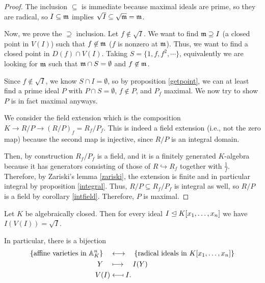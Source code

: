 \documentclass[12pt]{article}
\begin{document}
\begin{proof}
    The inclusion $\subseteq$ is immediate because maximal ideals are prime, so they are radical, so $I\subseteq \mathfrak{m}$ implies $\sqrt{I}\subseteq \sqrt{\mathfrak{m}} =\mathfrak{m}$.
    
    Now, we prove the $\supseteq$ inclusion. Let $f\not\in \sqrt{I}$. We want to find $\mathfrak{m} \supseteq I$ (a closed point in $V(I)$) such that $f\not\in \mathfrak{m}$ ($f$ is nonzero at $\mathfrak{m}$). Thus, we want to find a closed point in $D(f)\cap V(I)$. Taking $S=\{1,f,f^2,\cdots\}$, equivalently we are looking for $\mathfrak{m}$ such that $\mathfrak{m}\cap S =\emptyset$ and $f\not\in \mathfrak{m}$.
    
    Since $f\not\in \sqrt{I}$, we know $S\cap I =\emptyset$, so by proposition \ref{getpoint}, we can at least find a prime ideal $P$ with $P\cap S=\emptyset$, $f\not\in P$, and $P_f$ maximal. We now try to show $P$ is in fact maximal anyways.
    
    We consider the field extension which is the composition $K\to R/P \to (R/P)_f = R_f/P_f$. This is indeed a field extension (i.e., not the zero map) because the second map is injective, since $R/P$ is an integral domain.
    
    Then, by construction $R_f/P_f$ is a field, and it is a finitely generated $K$-algebra because it has generators consisting of those of $R\hookrightarrow R_f$ together with $\frac{1}{f}$. Therefore, by Zariski's lemma \ref{zariski}, the extension is finite and in particular integral by proposition \ref{integral}. Thus, $R/P \subseteq R_f/P_f$ is integral as well, so $R/P$ is a field by corollary \ref{intfield}. Therefore, $P$ is maximal.
\end{proof}

\begin{thm}
    Let $K$ be algebraically closed. Then for every ideal $I\trianglelefteq K[x_1,\dots,x_n]$ we have $I(V(I)) = \sqrt{I}$.
    
    In particular, there is a bijection
    \begin{align*}
        \{\text{affine varieties in } \mathbb{A}_K^n\} \quad &\longleftrightarrow \quad \{\text{radical ideals in } K[x_1,\dots,x_n]\}\\
        Y \quad &\longmapsto \quad I(Y)\\
        V(I) &\longmapsfrom I.
    \end{align*}
\end{thm}
\end{document}
